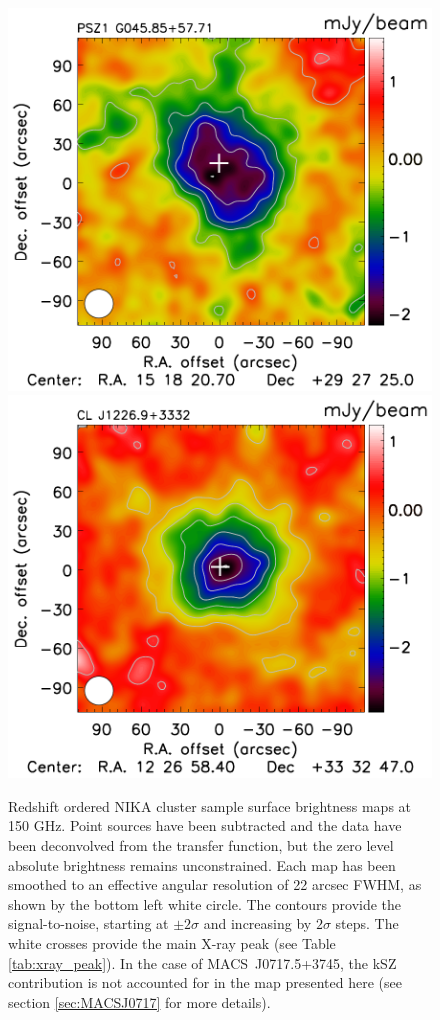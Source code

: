 \documentclass[twocolumn,traditabstract]{aa}
\begin{document}
\begin{figure}[h]
\includegraphics[trim=0cm 0cm 0cm 0cm, clip=true, totalheight=5.4cm]{Figure/Map_PSZ1G045.pdf}
\includegraphics[trim=0cm 0cm 0cm 0cm, clip=true, totalheight=5.4cm]{Figure/Map_CLJ1227.pdf}
\caption{\footnotesize{
Redshift ordered NIKA cluster sample surface brightness maps at 150 GHz. Point sources have been subtracted and the data have been deconvolved from the transfer function, but the zero level absolute brightness remains unconstrained. Each map has been smoothed to an effective angular resolution of 22 arcsec FWHM, as shown by the bottom left white circle. The contours provide the signal-to-noise, starting at $\pm 2 \sigma$ and increasing by $2 \sigma$ steps. The white crosses provide the main X-ray peak (see Table \ref{tab:xray_peak}). In the case of \mbox{MACS~J0717.5+3745}, the kSZ contribution is not accounted for in the map presented here (see section \ref{sec:MACSJ0717} for more details).}}
\label{fig:NIKA_cluster_sample}
\end{figure}
\end{document}
